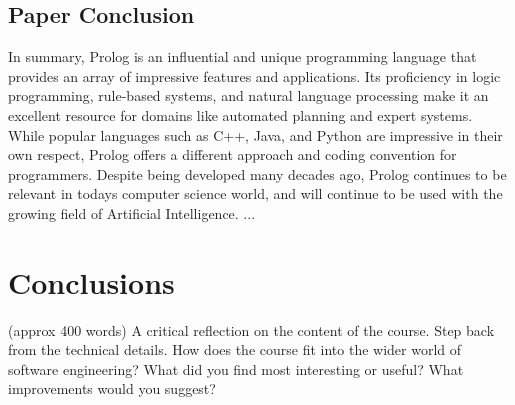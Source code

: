 \documentclass{article}
\theoremstyle{theorem}
\theoremstyle{definition}
\theoremstyle{remark}
\begin{document}
\subsection{Paper Conclusion}
In summary, Prolog is an influential and unique programming language that provides an array of impressive features and applications. Its proficiency in logic programming, rule-based systems, and natural language processing make it an excellent resource for domains like automated planning and expert systems. While popular languages such as C++, Java, and Python are impressive in their own respect, Prolog offers a different approach and coding convention for programmers. Despite being developed many decades ago, Prolog continues to be relevant in todays computer science world, and will continue to be used with the growing field of Artificial Intelligence.
...

\section{Conclusions}\label{conclusions}

(approx 400 words) A critical reflection on the content of the course. Step back from the technical details. How does the course fit into the wider world of software engineering? What did you find most interesting or useful? What improvements would you suggest?
\end{document}
